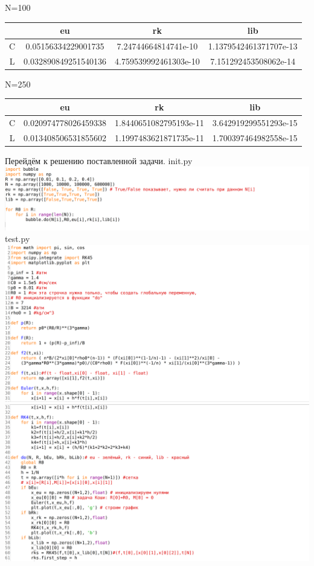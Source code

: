 \documentclass[a4paper,14pt]{article}
\begin{document}
N=100
\begin{center}
\begin{tabular}{ |c|c|c|c| } 
 \hline
 & eu & rk & lib \\
 \hline
 C& 0.05156334229001735 & 7.24744664814741e-10 & 1.1379542461371707e-13 \\
 \hline
 L& 0.032890849251540136 & 4.759539992461303e-10 & 7.151292453508062e-14 \\
 \hline
\end{tabular}
\end{center}
N=250
\begin{center}
\begin{tabular}{ |c|c|c|c| } 
 \hline
 & eu & rk & lib \\
 \hline
 C& 0.020974778026459338 & 1.8440651082795193e-11 & 3.642919299551293e-15 \\
 \hline
 L& 0.013408506531855602 & 1.1997483621871735e-11 & 1.700397464982558e-15 \\
 \hline
\end{tabular}
\end{center}
Перейдём к решению поставленной задачи.\newline
init.py\newline
\includegraphics[scale=0.20]{images/code/bubble init.png}\newline
test.py\newline
\includegraphics[scale=0.20]{images/code/bubble 1.png}
\includegraphics[scale=0.20]{images/code/bubble 2.png}
\end{document}

